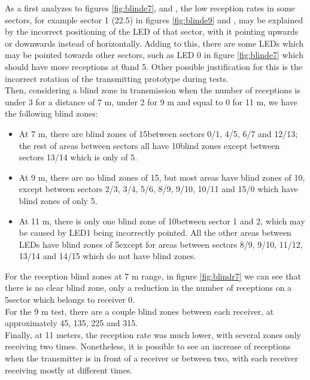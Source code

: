 As a first analyzes to figures \ref{fig:blinde7},  and , the low reception rates in some sectors, for example sector 1 (22.5\degree ) in figures \ref{fig:blinde9} and , may be explained by the incorrect positioning of the LED of that sector, with it pointing upwards or downwards instead of horizontally. Adding to this, there are some LEDs which may be pointed towards other sectors, such as LED 0 in figure \ref{fig:blinde7} which should have more receptions at 0\degree and 5\degree . Other possible justification for this is the incorrect rotation of the transmitting prototype during tests.\\

Then, considering a blind zone in transmission when the number of receptions is under 3 for a distance of 7 m, under 2 for 9 m and equal to 0 for 11 m, we have the following blind zones:
\begin{itemize}
\item At 7 m, there are blind zones of 15\degree between sectors 0/1, 4/5, 6/7 and 12/13; the rest of areas between sectors all have 10\degree blind zones except between sectors 13/14 which is only of 5\degree .
\item At 9 m, there are no blind zones of 15\degree , but most areas have blind zones of 10\degree , except between sectors 2/3, 3/4, 5/6, 8/9, 9/10, 10/11 and 15/0 which have blind zones of only 5\degree .
\item At 11 m, there is only one blind zone of 10\degree between sector 1 and 2, which may be caused by LED1 being incorrectly pointed. All the other areas between LEDs have blind zones of 5\degree except for areas between sectors 8/9, 9/10, 11/12, 13/14 and 14/15 which do not have blind zones.
\end{itemize}

For the reception blind zones at 7 m range, in figure \ref{fig:blindr7} we can see that there is no clear blind zone, only a reduction in the number of receptions on a 5\degree sector which belongs to receiver 0.\\
For the 9 m test, there are a couple blind zones between each receiver, at approximately 45, 135, 225 and 315\degree .\\
Finally, at 11 meters, the reception rate was much lower, with several zones only receiving two times. Nonetheless, it is possible to see an increase of receptions when the transmitter is in front of a receiver or between two, with each receiver receiving mostly at different times.\\

